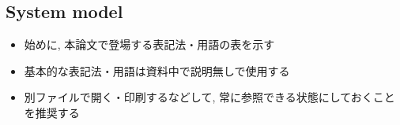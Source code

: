 


\subsection{System model}
\label{ssec: system model}

\begin{frame}{}
    \begin{itemize}
        \item 始めに, 本論文で登場する表記法・用語の表を示す
        \item 基本的な表記法・用語は資料中で説明無しで使用する
        \item 別ファイルで開く・印刷するなどして, 常に参照できる状態にしておくことを推奨する
    \end{itemize}
\end{frame}

